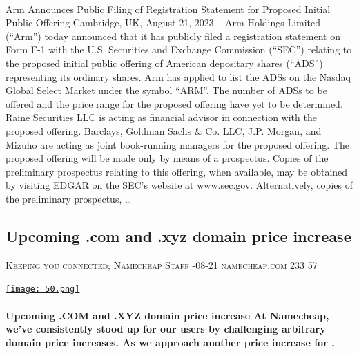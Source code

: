 \documentclass[10pt,a4paper]{article}
\begin{document}
\begin{multicols}{2}
\paragraph{}
Arm Announces Public Filing of Registration Statement for Proposed Initial Public Offering
Cambridge, UK, August 21, 2023 – Arm Holdings Limited (“Arm”) today announced that it has publicly filed a registration statement on Form F-1 with the U.S. Securities and Exchange Commission (“SEC”) relating to the proposed initial public offering of American depositary shares (“ADS”) representing its ordinary shares. Arm has applied to list the ADSs on the Nasdaq Global Select Market under the symbol “ARM”. The number of ADSs to be offered and the price range for the proposed offering have yet to be determined.
Raine Securities LLC is acting as financial advisor in connection with the proposed offering. Barclays, Goldman Sachs \& Co. LLC, J.P. Morgan, and Mizuho are acting as joint book-running managers for the proposed offering.
The proposed offering will be made only by means of a prospectus. Copies of the preliminary prospectus relating to this offering, when available, may be obtained by visiting EDGAR on the SEC's website at www.sec.gov. Alternatively, copies of the preliminary prospectus,
\dots\par
\noindent\begin{minipage}{\linewidth}
\medskip
\subsection{Upcoming .com and .xyz domain price increase}
\textsc{\footnotesize
{\scriptsize\faUser}\space 
Keeping you connected; Namecheap Staff 
{\scriptsize\faCalendar}-08-21 
{\scriptsize\faGlobe}\space 
namecheap.com 
{\scriptsize\faThumbsOUp}\space 
\href{http://news.ycombinator.com/item?id=37211675\&utm\_term=comment}{233} 
{\scriptsize\faComments}\space 
\href{http://news.ycombinator.com/item?id=37211675\&utm\_term=comment}{57} 
}
\par\medskip\noindent
\href{https://www.namecheap.com/blog/upcoming-com-and-xyz-domain-price-increase/?utm\_source=hackernewsletter\&utm\_medium=email\&utm\_term=startup\_news}{
    \texttt{[image: 50.png]}
}
\end{minipage}
\paragraph{}
\textbf{Upcoming .COM and .XYZ domain price increase
At Namecheap, we’ve consistently stood up for our users by challenging arbitrary domain price increases. As we approach another price increase for .}

\end{multicols}
\end{document}
